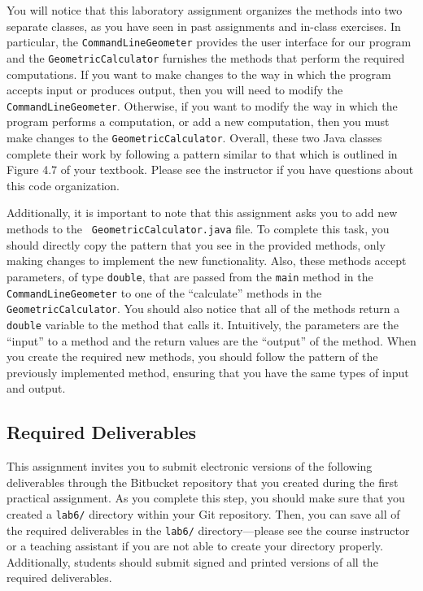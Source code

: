 You will notice that this laboratory assignment organizes the methods into two separate classes, as you have seen in
past assignments and in-class exercises. In particular, the {\tt CommandLineGeometer} provides the user interface for
our program and the {\tt GeometricCalculator} furnishes the methods that perform the required computations.  If you want
to make changes to the way in which the program accepts input or produces output, then you will need to modify the {\tt
  CommandLineGeometer}. Otherwise, if you want to modify the way in which the program performs a computation, or add a
new computation, then you must make changes to the {\tt GeometricCalculator}. Overall, these two Java classes complete
their work by following a pattern similar to that which is outlined in Figure 4.7 of your textbook. Please see the
instructor if you have questions about this code organization.

Additionally, it is important to note that this assignment asks you to add new methods to the {\tt
  GeometricCalculator.java} file.  To complete this task, you should directly copy the pattern that you see in the
provided methods, only making changes to implement the new functionality.  Also, these methods accept parameters, of
type {\tt double}, that are passed from the {\tt main} method in the {\tt CommandLineGeometer} to one of the
``calculate'' methods in the {\tt GeometricCalculator}. You should also notice that all of the methods return a {\tt
  double} variable to the method that calls it.  Intuitively, the parameters are the ``input'' to a method and the return
values are the ``output'' of the method.  When you create the required new methods, you should follow the pattern of the
previously implemented method, ensuring that you have the same types of input and output.

\vspace*{-.1in}
\subsection*{Required Deliverables}

This assignment invites you to submit electronic versions of the following deliverables through the Bitbucket repository
that you created during the first practical assignment.  As you complete this step, you should make sure that you
created a {\tt lab6/} directory within your Git repository.  Then, you can save all of the required deliverables in the
{\tt lab6/} directory---please see the course instructor or a teaching assistant if you are not able to create your
directory properly.  Additionally, students should submit signed and printed versions of all the required deliverables.

